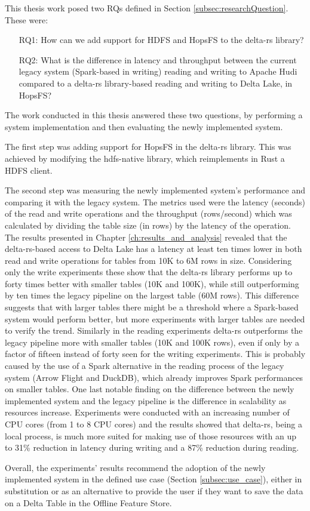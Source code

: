 This thesis work posed two \glspl{RQ} defined in Section \ref{subsec:researchQuestion}. These were: 
\begin{enumerate}
    \item[RQ1:] How can we add support for \gls{HDFS} and \gls{HopsFS} to the delta-rs library?
    \item[RQ2:] What is the difference in latency and throughput between the current legacy system (Spark-based in writing) reading and writing to Apache Hudi compared to a delta-rs library-based reading and writing to Delta Lake, in \gls{HopsFS}?
\end{enumerate}
The work conducted in this thesis answered these two questions, by performing a system implementation and then evaluating the newly implemented system. 

The first step was adding support for \gls{HopsFS} in the delta-rs library. This was achieved by modifying the hdfs-native \cite{binfordKimahrimanHdfsnative2024} library, which reimplements in Rust a \gls{HDFS} client. 

The second step was measuring the newly implemented system's performance and comparing it with the legacy system. The metrics used were the latency (seconds) of the read and write operations and the throughput (rows/second) which was calculated by dividing the table size (in rows) by the latency of the operation. The results presented in Chapter \ref{ch:results_and_analysis} revealed that the delta-rs-based access to Delta Lake has a latency at least ten times lower in both read and write operations for tables from 10K to 6M rows in size. Considering only the write experiments these show that the delta-rs library performs up to forty times better with smaller tables (10K and 100K), while still outperforming by ten times the legacy pipeline on the largest table (60M rows). This difference suggests that with larger tables there might be a threshold where a Spark-based system would perform better, but more experiments with larger tables are needed to verify the trend. Similarly in the reading experiments delta-rs outperforms the legacy pipeline more with smaller tables (10K and 100K rows), even if only by a factor of fifteen instead of forty seen for the writing experiments. This is probably caused by the use of a Spark alternative in the reading process of the legacy system (Arrow Flight and DuckDB), which already improves Spark performances on smaller tables. One last notable finding on the difference between the newly implemented system and the legacy pipeline is the difference in scalability as resources increase. Experiments were conducted with an increasing number of \gls{CPU} cores (from 1 to 8 \gls{CPU} cores) and the results showed that delta-rs, being a local process, is much more suited for making use of those resources with an up to 31\% reduction in latency during writing and a 87\% reduction during reading.

Overall, the experiments' results recommend the adoption of the newly implemented system in the defined use case (Section \ref{subsec:use_case}), either in substitution or as an alternative to provide the user if they want to save the data on a Delta Table in the Offline Feature Store.
